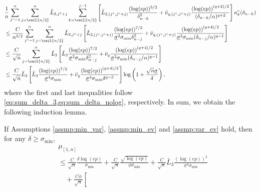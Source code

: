 \documentclass[aos]{imsart}
\begin{document}
\begin{appendix}
\begin{equation*}
\begin{aligned}
    & \frac{1}{n} \sum_{j^\circ=1}^n \sum_{j=\ceil{n/2}}^{n} \tilde L_{3,j^\circ+j} \sum_{k=\ceil{n/2}}^{j-1} \left[ 
        \bar{L}_{3,(j^\circ,j^\circ+j)} \frac{(\log(ep))^{5/2}}{\delta_{n-k}^5}
        + \bar{\nu}_{q,(j^\circ,j^\circ+j)} \frac{{(\log(ep))}^{(q+2)/2}}{(\delta_{n-k}/\alpha)^{q+2}}
    \right] 
    \kappa^\circ_{k}(\delta_{n-k}) \\
    & \leq \frac{C}{n^{3/2}} \sum_{j^\circ=1}^n \sum_{j=\ceil{n/2}}^{n} \tilde L_{3,j^\circ+j} 
    \left[ 
        \bar{L}_{3,(j^\circ,j^\circ+j)} \frac{(\log(ep))^{7/2}}{ \underline{\sigma}^{2}\sigma_{\min} \delta_{n-j}^2}
        + \bar{\nu}_{q,(j^\circ,j^\circ+j)} \frac{{(\log(ep))}^{(q+4)/2}}{\underline{\sigma}^{2}\sigma_{\min} (\delta_{n-j}/\alpha)^{q-1}}
    \right] \\
    & \leq \frac{C}{\sqrt{n}} \sum_{j=\ceil{n/2}}^{n} \bar{L}_{3} 
    \left[ 
        \bar{L}_{3} \frac{(\log(ep))^{7/2}}{ \underline{\sigma}^{2}\sigma_{\min} \delta_{n-j}^2}
        + \bar{\nu}_{q} \frac{{(\log(ep))}^{(q+4)/2}}{\underline{\sigma}^{2}\sigma_{\min} (\delta_{n-j}/\alpha)^{q-1}}
    \right] \\
    & \leq \frac{C}{\sqrt{n}} \bar{L}_{3} 
    \left[ 
        \bar{L}_{3} \frac{(\log(ep))^{7/2}}{ \underline{\sigma}^{4}\sigma_{\min}} 
        + \bar{\nu}_{q} \frac{{(\log(ep))}^{(q+4)/2}}{\underline{\sigma}^{4}\sigma_{\min} \delta^{q-3}}
    \right] \log\left(1 + \frac{\sqrt{n}\underline{\sigma}}{\delta}\right),
\end{aligned}
\end{equation*}
where the first and last inequalities follow \cref{eq:sum_delta_3,eq:sum_delta_nolog}, respectively.
In sum, we obtain the following induction lemma.
\begin{lemma} \label{thm:induction_lemma_BE_4P}
    If Assumptions \eqref{assmp:min_var}, \eqref{assmp:min_ev} and \eqref{assmp:var_ev} hold, then 
    for any $\delta \geq \sigma_{\min}$,
    \begin{equation*}
    \begin{aligned}
        & \mu_{[1,n]} \\
        & \leq \frac{C}{\sqrt{n}} \frac{\delta \log(ep)}{\sigma_{\min}}  
        + \frac{C}{\sqrt{n}} \frac{\sqrt{\log(ep)}}{\phi \sigma_{\min}}
        + \frac{C}{\sqrt{n}} \bar{L}_{3} \frac{(\log(ep))^{2}}{\underline{\sigma}^2 \sigma_{\min}} \\
        & \quad + \frac{C\phi}{\sqrt{n}} \left[

\end{aligned}
\end{equation*}
\end{lemma}
\end{appendix}
\end{document}
